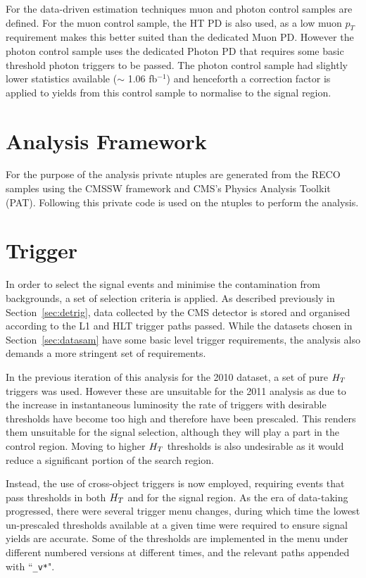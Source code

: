 For the data-driven estimation techniques muon and photon control samples are defined. For the muon control sample, the HT PD is also used, as a low muon $p_{T}$ requirement makes this better suited than the dedicated Muon PD. However the photon control sample uses the dedicated Photon PD that requires some basic threshold photon triggers to be passed. The photon control sample had slightly lower statistics available ($\sim$ 1.06 fb$^{-1}$) and henceforth a correction factor is applied to yields from this control sample to normalise to the signal region.


\section{Analysis Framework}

For the purpose of the analysis private ntuples are generated from the RECO samples using the CMSSW framework and CMS's Physics Analysis Toolkit (PAT). Following this private code is used on the ntuples to perform the analysis.



\section{Trigger}
\label{sec:trig}
In order to select the signal events and minimise the contamination from backgrounds, a set of selection criteria is applied. As described previously in Section~\ref{sec:detrig}, data collected by the CMS detector is stored and organised according to the L1 and HLT trigger paths passed. While the datasets chosen in Section~\ref{sec:datasam} have some basic level trigger requirements, the analysis also demands a more stringent set of requirements.


In the previous iteration of this analysis for the 2010 dataset, a set of pure $H_{T}$ triggers was used. However these are unsuitable for the 2011 analysis as due to the increase in instantaneous luminosity the rate of triggers with desirable thresholds have become too high and therefore have been prescaled. This renders them unsuitable for the signal selection, although they will play a part in the control region. Moving to higher $H_{T}$ thresholds is also undesirable as it would reduce a significant portion of the search region.

Instead, the use of cross-object triggers is now employed, requiring events that pass thresholds in both $H_{T}$ and \mht for the signal region. As the era of data-taking progressed, there were several trigger menu changes, during which time the lowest un-prescaled thresholds available at a given time were required to ensure signal yields are accurate. Some of the thresholds are implemented in the menu under different numbered versions at different times, and the relevant paths appended with ``\verb!_v*!".


